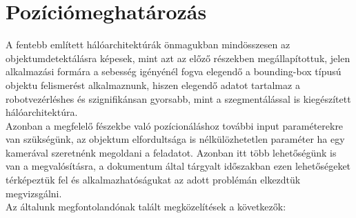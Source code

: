 \documentclass{article}
\begin{document}
\section{Pozíciómeghatározás}
A fentebb említett hálóarchitektúrák önmagukban mindösszesen az objektumdetektálásra képesek, mint azt az előző
részekben megállapítottuk, jelen alkalmazási formára a sebesség igényénél fogva elegendő a bounding-box típusú
objektu felismerést alkalmaznunk, hiszen elegendő adatot tartalmaz a robotvezérléshes és szignifikánsan gyorsabb,
mint a szegmentálással is kiegészített hálóarchitektúra.\\[5pt]
Azonban a megfelelő fészekbe való pozícionáláshoz további input paraméterekre van szükségünk, az objektum elfordultsága
is nélkülözhetetlen paraméter ha egy kamerával szeretnénk megoldani a feladatot. Azonban itt több lehetőségünk is van a 
megvalósításra, a dokumentum által tárgyalt időszakban ezen lehetőségeket térképeztük fel és alkalmazhatóságukat 
az adott problémán elkezdtük megvizsgálni.\\
Az általunk megfontolandónak talált megközelítések a következők:
\end{document}
